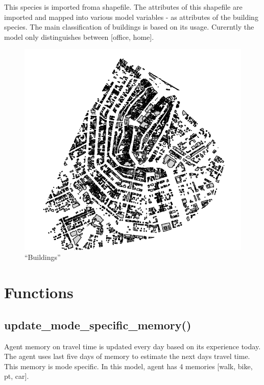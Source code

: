 \documentclass[]{book}
\theoremstyle{definition}
\theoremstyle{definition}
\theoremstyle{definition}
\theoremstyle{remark}
\begin{document}
This species is imported froma shapefile. The attributes of this
shapefile are imported and mapped into various model variables - as
attributes of the building species. The main classification of buildings
is based on its usage. Curerntly the model only distinguishes between
{[}office, home{]}.

\begin{figure}
\centering
\includegraphics{images/buildings.png}
\caption{``Buildings''}
\end{figure}

\hypertarget{functions}{%
\chapter{Functions}\label{functions}}

\hypertarget{update_mode_specific_memory}{%
\section{update\_mode\_specific\_memory()}\label{update_mode_specific_memory}}

Agent memory on travel time is updated every day based on its experience
today. The agent uses last five days of memory to estimate the next days
travel time. This memory is mode specific. In this model, agent has 4
memories {[}walk, bike, pt, car{]}. 
\end{document}
